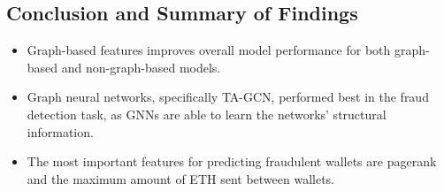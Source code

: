 \documentclass[article,36pt,extrafontsizes,oneside,openany,oldfontcommands]{memoir}
\begin{document}
\begin{adjmulticols*}{3}{0.5in}{0.5in}
\section{Conclusion and Summary of Findings}
\begin{adjustwidth}{0.1in}{0in}
\begin{itemize}[topsep=0pt,itemsep=0ex,partopsep=0ex,parsep=0ex]
\item Graph-based features improves overall model performance for both graph-based and non-graph-based models.
\item Graph neural networks, specifically TA-GCN, performed best in the fraud detection task, as GNNs are able to learn the networks’ structural information.
\item The most important features for predicting  fraudulent wallets are pagerank and the maximum amount of ETH sent between wallets.


\end{itemize} 
\end{adjustwidth}


\end{adjmulticols*}
\end{document}
